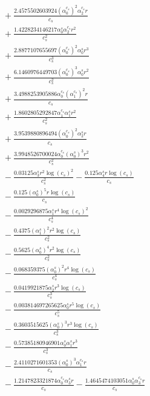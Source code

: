 \documentclass[10pt]{article}
\begin{document}
\begin{align*}
&{}  + \frac{2.4575502603924 \left(\alpha_{0}^{c_s}\right)^{2} \alpha_{2}^{c_s} r}{c_{s}} \\
&{}  + \frac{1.4228234146217 \alpha_{0}^s \alpha_{2}^{c_s} r^{2}}{c_{s}^{2}} \\
&{}  + \frac{2.8877107655697 \left(\alpha_{0}^{c_s}\right)^{2} \alpha_{0}^s r^{3}}{c_{s}^{3}} \\
&{}  + \frac{6.1460976449703 \left(\alpha_{0}^{c_s}\right)^{3} \alpha_{0}^s r^{2}}{c_{s}^{2}} \\
&{}  + \frac{3.4988253905886 \alpha_{0}^{c_s} \left(\alpha_{1}^{c_s}\right)^{2} r}{c_{s}} \\
&{}  + \frac{1.8602805292847 \alpha_{1}^{c_s} \alpha_{1}^s r^{2}}{c_{s}^{2}} \\
&{}  + \frac{3.9539880896494 \left(\alpha_{0}^{c_s}\right)^{2} \alpha_{2}^s r}{c_{s}} \\
&{}  + \frac{3.9948526700024 \alpha_{0}^{c_s} \left(\alpha_{0}^s\right)^{3} r^{2}}{c_{s}^{2}} \\
&{}  - \frac{0.03125 \alpha_{3}^s r^{2} \log{\left(c_{s} \right)}^{2}}{c_{s}^{2}} - \frac{0.125 \alpha_{4}^s r \log{\left(c_{s} \right)}}{c_{s}} \\
&{}  - \frac{0.125 \left(\alpha_{0}^s\right)^{5} r \log{\left(c_{s} \right)}}{c_{s}} \\
&{}  - \frac{0.0029296875 \alpha_{1}^s r^{4} \log{\left(c_{s} \right)}^{2}}{c_{s}^{4}} \\
&{}  - \frac{0.4375 \left(\alpha_{1}^s\right)^{2} r^{2} \log{\left(c_{s} \right)}}{c_{s}^{2}} \\
&{}  - \frac{0.5625 \left(\alpha_{0}^s\right)^{4} r^{2} \log{\left(c_{s} \right)}}{c_{s}^{2}} \\
&{}  - \frac{0.068359375 \left(\alpha_{0}^s\right)^{2} r^{4} \log{\left(c_{s} \right)}}{c_{s}^{4}} \\
&{}  - \frac{0.0419921875 \alpha_{2}^s r^{3} \log{\left(c_{s} \right)}}{c_{s}^{3}} \\
&{}  - \frac{0.003814697265625 \alpha_{0}^s r^{5} \log{\left(c_{s} \right)}}{c_{s}^{5}} \\
&{}  - \frac{0.3603515625 \left(\alpha_{0}^s\right)^{3} r^{3} \log{\left(c_{s} \right)}}{c_{s}^{3}} \\
&{}  - \frac{0.57385180946901 \alpha_{0}^s \alpha_{1}^s r^{3}}{c_{s}^{3}} \\
&{}  - \frac{2.4110271601353 \left(\alpha_{0}^s\right)^{3} \alpha_{1}^{c_s} r}{c_{s}} \\
&{}  - \frac{1.2147823321874 \alpha_{0}^{c_s} \alpha_{3}^s r}{c_{s}} - \frac{1.4645474103051 \alpha_{0}^s \alpha_{3}^{c_s} r}{c_{s}} \\

\end{align*}
\end{document}
